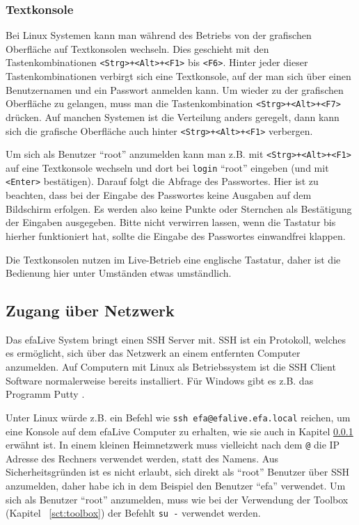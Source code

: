 \documentclass[a4paper,12pt,twoside]{article}
\begin{document}
\subsubsection{Textkonsole}
\label{sct:textkonsole}
Bei Linux Systemen kann man während
des Betriebs von der grafischen Oberfläche auf Textkonsolen wechseln.
Dies geschieht mit den Tastenkombinationen
\texttt{{\textless}Strg{\textgreater}+{\textless}Alt{\textgreater}+{\textless}F1{\textgreater}}
bis \texttt{{\textless}F6{\textgreater}}. Hinter jeder dieser
Tastenkombinationen verbirgt sich eine Textkonsole, auf der man sich
über einen Benutzernamen und ein Passwort anmelden kann. Um wieder zu
der grafischen Oberfläche zu gelangen, muss man die Tastenkombination
\texttt{{\textless}Strg{\textgreater}+{\textless}Alt{\textgreater}+{\textless}F7{\textgreater}}
drücken. Auf manchen Systemen ist die Verteilung anders geregelt, dann
kann sich die grafische Oberfläche auch hinter
\texttt{{\textless}Strg{\textgreater}+{\textless}Alt{\textgreater}+{\textless}F1{\textgreater}}
verbergen.

Um sich als Benutzer "`root"' anzumelden kann
man z.B. mit
\texttt{{\textless}Strg{\textgreater}+{\textless}Alt{\textgreater}+{\textless}F1{\textgreater}}
auf eine Textkonsole wechseln und dort bei
\texttt{login} "`root"'
eingeben (und mit \texttt{{\textless}Enter{\textgreater}} bestätigen). Darauf
folgt die Abfrage des Passwortes. Hier ist zu beachten, dass bei der
Eingabe des Passwortes keine Ausgaben auf dem Bildschirm erfolgen. Es
werden also keine Punkte oder Sternchen als Bestätigung der Eingaben
ausgegeben. Bitte nicht verwirren lassen, wenn die Tastatur bis hierher
funktioniert hat, sollte die Eingabe des Passwortes einwandfrei
klappen.

Die Textkonsolen nutzen im Live-Betrieb eine englische Tastatur, daher
ist die Bedienung hier unter Umständen etwas umständlich.


\subsection{Zugang über Netzwerk}
\label{sct:zugang_netzwerk}
Das efaLive System bringt einen SSH Server mit. SSH ist ein Protokoll,
welches es ermöglicht, sich über das Netzwerk an einem entfernten
Computer anzumelden. Auf Computern mit Linux als Betriebssystem ist die
SSH Client Software normalerweise bereits installiert. Für Windows gibt
es z.B. das Programm Putty \cite{PUT1}.

Unter Linux würde z.B. ein Befehl wie \texttt{ssh efa@efalive.efa.local} 
reichen, um eine Konsole auf dem
efaLive Computer zu erhalten, wie sie auch in Kapitel
\ref{sct:textkonsole} erwähnt ist. In einem kleinen Heimnetzwerk
muss vielleicht nach dem \texttt{@} die IP Adresse
des Rechners verwendet werden, statt des Namens. Aus Sicherheitsgründen
ist es nicht erlaubt, sich direkt als
"`root"' Benutzer über SSH anzumelden, daher
habe ich in dem Beispiel den Benutzer "`efa"'
verwendet. Um sich als Benutzer "`root"'
anzumelden, muss wie bei der Verwendung der Toolbox (Kapitel
~\ref{sct:toolbox}) der Befehlt \texttt{su -} verwendet werden.
\end{document}
